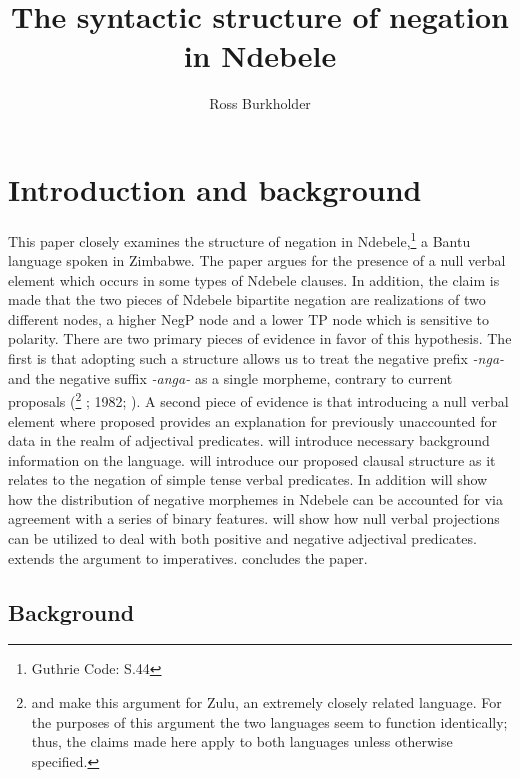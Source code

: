 \documentclass[output=paper]{langsci/langscibook}
\title{The syntactic structure of negation in Ndebele}
\author{%
 Ross Burkholder \affiliation{University of Chicago}
}
\newcommand{\nga}[0]{\textit {-nga- }}
\begin{document}

 

  

\section{Introduction and background}

This paper closely examines the structure of negation in Ndebele,\footnote{Guthrie Code: S.44} a Bantu language spoken in Zimbabwe. The paper argues for the presence of a null verbal element which occurs in some types of Ndebele clauses. In addition, the claim is made that the two pieces of Ndebele bipartite negation are realizations of two different nodes, a higher NegP node and a lower TP node which is sensitive to polarity. There are two primary pieces of evidence in favor of this hypothesis. The first is that adopting such a structure allows us to treat the negative prefix \nga and the negative suffix \textit{-anga-} as a single morpheme, contrary to current proposals (\citet{Buell2004,Buell2005}\footnote{\citet{Buell2004} and \citeyear{Buell2005} make this argument for Zulu, an extremely closely related language. For the purposes of this argument the two languages seem to function identically; thus, the claims made here apply to both languages unless otherwise specified.} \citealt{Khumalo1981}; 1982; \citealt{Sibanda2004}). A second piece of evidence is that introducing a null verbal element where proposed provides an explanation for previously unaccounted for data in the realm of adjectival predicates.  will introduce necessary background information on the language.   will introduce our proposed clausal structure as it relates to the negation of simple tense verbal predicates. In addition  will show how the distribution of negative morphemes in Ndebele can be accounted for via agreement with a series of binary features.  will show how null verbal projections can be utilized to deal with both positive and negative adjectival predicates.  extends the argument to imperatives.  concludes the paper. 


\subsection{Background}
\end{document}
